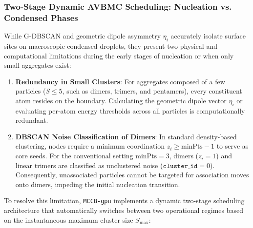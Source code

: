 \documentclass[final,5p,times,twocolumn]{elsarticle}
\begin{document}
\subsubsection{Two-Stage Dynamic AVBMC Scheduling: Nucleation vs. Condensed Phases}
\label{sec:algo_twostage_avbmc}

While \textsc{G-DBSCAN} and geometric dipole asymmetry $\eta_i$
accurately isolate surface sites on macroscopic condensed droplets,
they present two physical and computational limitations during the
early stages of nucleation or when only small aggregates exist: 
\begin{enumerate}
    \item \textbf{Redundancy in Small Clusters}: For aggregates composed of a few particles ($S \le 5$, such as dimers, trimers, and pentamers), every constituent atom resides on the boundary. Calculating the geometric dipole vector $\eta_i$ or evaluating per-atom energy thresholds across all particles is computationally redundant.
    \item \textbf{DBSCAN Noise Classification of Dimers}: In standard density-based clustering, nodes require a minimum coordination $z_i \ge \text{minPts} - 1$ to serve as core seeds. For the conventional setting $\text{minPts} = 3$, dimers ($z_i = 1$) and linear trimers are classified as unclustered noise ($\texttt{cluster\_id} = 0$). Consequently, unassociated particles cannot be targeted for association moves onto dimers, impeding the initial nucleation transition.
\end{enumerate}

To resolve this limitation, \texttt{MCCB-gpu} implements a dynamic two-stage scheduling architecture that automatically switches between two operational regimes based on the instantaneous maximum cluster size $S_{\max}$:
\end{document}

